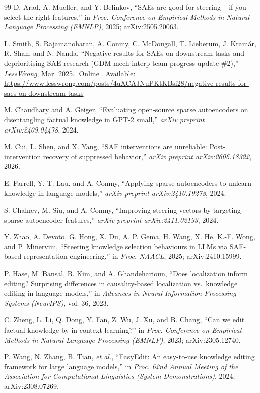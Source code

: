 \documentclass[12pt,a4paper]{report}
\begin{document}
\begin{thebibliography}{99}
 D. Arad, A. Mueller, and Y. Belinkov, ``SAEs are good for steering -- if you select the right features,'' in \textit{Proc. Conference on Empirical Methods in Natural Language Processing (EMNLP)}, 2025; arXiv:2505.20063.

 L. Smith, S. Rajamanoharan, A. Conmy, C. McDougall, T. Lieberum, J. Kram\'ar, R. Shah, and N. Nanda, ``Negative results for SAEs on downstream tasks and deprioritising SAE research (GDM mech interp team progress update \#2),'' \textit{LessWrong}, Mar. 2025. [Online]. Available: \url{https://www.lesswrong.com/posts/4uXCAJNuPKtKBsi28/negative-results-for-saes-on-downstream-tasks}

 M. Chaudhary and A. Geiger, ``Evaluating open-source sparse autoencoders on disentangling factual knowledge in GPT-2 small,'' \textit{arXiv preprint arXiv:2409.04478}, 2024.

 M. Cui, L. Shen, and X. Yang, ``SAE interventions are unreliable: Post-intervention recovery of suppressed behavior,'' \textit{arXiv preprint arXiv:2606.18322}, 2026.

 E. Farrell, Y.-T. Lau, and A. Conmy, ``Applying sparse autoencoders to unlearn knowledge in language models,'' \textit{arXiv preprint arXiv:2410.19278}, 2024.

 S. Chalnev, M. Siu, and A. Conmy, ``Improving steering vectors by targeting sparse autoencoder features,'' \textit{arXiv preprint arXiv:2411.02193}, 2024.

 Y. Zhao, A. Devoto, G. Hong, X. Du, A. P. Gema, H. Wang, X. He, K.-F. Wong, and P. Minervini, ``Steering knowledge selection behaviours in LLMs via SAE-based representation engineering,'' in \textit{Proc. NAACL}, 2025; arXiv:2410.15999.

 P. Hase, M. Bansal, B. Kim, and A. Ghandeharioun, ``Does localization inform editing? Surprising differences in causality-based localization vs.\ knowledge editing in language models,'' in \textit{Advances in Neural Information Processing Systems (NeurIPS)}, vol. 36, 2023.

 C. Zheng, L. Li, Q. Dong, Y. Fan, Z. Wu, J. Xu, and B. Chang, ``Can we edit factual knowledge by in-context learning?'' in \textit{Proc. Conference on Empirical Methods in Natural Language Processing (EMNLP)}, 2023; arXiv:2305.12740.

 P. Wang, N. Zhang, B. Tian, \textit{et al.}, ``EasyEdit: An easy-to-use knowledge editing framework for large language models,'' in \textit{Proc. 62nd Annual Meeting of the Association for Computational Linguistics (System Demonstrations)}, 2024; arXiv:2308.07269.


\end{thebibliography}
\end{document}
